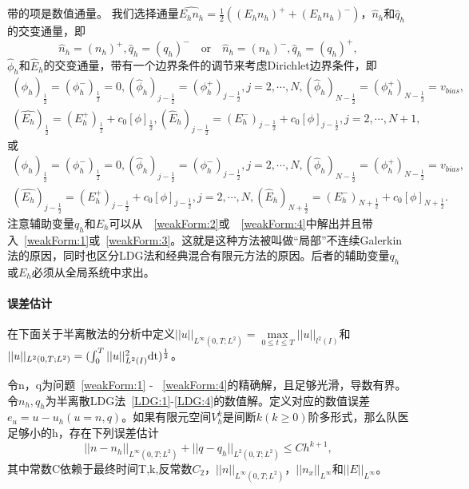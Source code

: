 带$\widehat{}$的项是数值通量。 我们选择通量$\hat{E_h n_h} = \frac{1}{2}((E_hn_h)^+  + (E_hn_h)^-)$，$\hat{n}_h$和$\hat{q}_h$的交变通量，即
\begin{equation}
    \hat{n}_h = (n_h)^+, \hat{q}_h = (q_h)^- \quad \text{or} \quad \hat{n}_h = (n_h)^-, \hat{q}_h = (q_h)^+, \label{numbericalFlux:n&q}
\end{equation}
$\hat{\phi}_h$和$\hat{E}_h$的交变通量，带有一个边界条件的调节来考虑Dirichlet边界条件，即
\begin{equation}
    \begin{aligned}
        (\hat{\phi}_h)_{\frac{1}{2}} = (\phi_h^-)_{\frac{1}{2}} = 0, (\hat{\phi}_h)_{j-\frac{1}{2}} = (\phi_h^+)_{j-\frac{1}{2}},j = 2,\cdots,N,(\hat{\phi}_h)_{N-\frac{1}{2}} = (\phi_h^+)_{N-\frac{1}{2}} = v_{bias}, \\
        (\hat{E_h})_{\frac{1}{2}} = (E_h^+)_{\frac{1}{2}} + c_0[\phi]_{\frac{1}{2}}, (\hat{E}_h)_{j-\frac{1}{2}} = (E_h^-)_{j-\frac{1}{2}} + c_0[\phi]_{j-\frac{1}{2}},j = 2,\cdots,N+1,
    \end{aligned}\label{numbericalFlux:phi&E}
\end{equation}
或
\begin{equation}
    \begin{aligned}
        (\hat{\phi}_h)_{\frac{1}{2}} = (\phi_h^-)_{\frac{1}{2}} = 0, (\hat{\phi}_h)_{j-\frac{1}{2}} = (\phi_h^-)_{j-\frac{1}{2}},j = 2,\cdots,N,(\hat{\phi}_h)_{N-\frac{1}{2}} = (\phi_h^+)_{N-\frac{1}{2}} = v_{bias}, \\
        (\hat{E_h})_{j - \frac{1}{2}} = (E_h^+)_{j - \frac{1}{2}} + c_0[\phi]_{j-\frac{1}{2}},j = 2,\cdots,N, (\hat{E}_h)_{N+\frac{1}{2}} = (E_h^-)_{N+\frac{1}{2}} + c_0[\phi]_{N+\frac{1}{2}}.
    \end{aligned}\label{numbericalFlux:phi&E alt}
\end{equation}
注意辅助变量$q_h$和$E_h$可以从~~\eqref{weakForm:2}或~~\eqref{weakForm:4}中解出并且带入~\eqref{weakForm:1}或~\eqref{weakForm:3}。这就是这种方法被叫做“局部”不连续Galerkin法的原因，同时也区分LDG法和经典混合有限元方法的原因。后者的辅助变量$q_h$或$E_h$必须从全局系统中求出。

\paragraph{误差估计}
在下面关于半离散法的分析中定义$||u||_{L^{\infty}(0,T;L^2)}  = \max \limits_{0 \leq t \leq T}||u||_{l^2(I)}$和$||u||_{L^2(0,T;L^2)} = (\int_{0}^{T}||u||_{L^2(I)}^2\rm{d}t)^{\frac{1}{2}}$。
\begin{theorem}
    令n，q为问题~\eqref{weakForm:1} - ~\eqref{weakForm:4}的精确解，且足够光滑，导数有界。令$n_h,q_h$为半离散LDG法~\eqref{LDG:1}-\eqref{LDG:4}的数值解。定义对应的数值误差$e_u = u - u_h (u = n,q)$。如果有限元空间$V_h^k$是间断$k(k\geq 0)$阶多形式，那么队医足够小的h，存在下列误差估计
    \begin{equation}
        ||n - n_h||_{L^{\infty}(0,T;L^2)} + ||q - q_h||_{L^2(0,T;L^2)} \leq C h^{k+1},
    \end{equation}
    其中常数C依赖于最终时间T,k,反常数$C_2$，$||n||_{L^{\infty}(0,T;L^2)}$，$||n_x||_{L^{\infty}}$和$||E||_{L^{\infty}}$。
\end{theorem}
